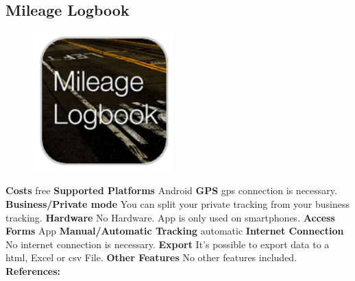 \begin{singlespace}
\section{Mileage Logbook}
\begin{figure}
  \begin{center}
    \includegraphics[width=0.48\textwidth]{bilder/mileage}
  \end{center}
\end{figure}
\textbf{Costs} free
\newline\newline
\textbf{Supported Platforms} Android 
\newline\newline
\textbf{GPS} \gls{gps} connection is necessary.
\newline\newline
\textbf{Business/Private mode} You can split your private tracking from your business tracking.
\newline\newline
\textbf{Hardware} No Hardware. App is only used on smartphones.
\newline\newline
\textbf{Access Forms} App
\newline\newline
\textbf{Manual/Automatic Tracking} automatic
\newline\newline
\textbf{Internet Connection} No internet connection is necessary.
\newline\newline
\textbf{Export} It’s possible to export data to a \gls{html}, Excel or \gls{csv} File.
\newline\newline
\textbf{Other Features} No other features included.
\newline\newline
\textbf{References:} \cite{Mileage_Logbook}
\newpage


\end{singlespace}
